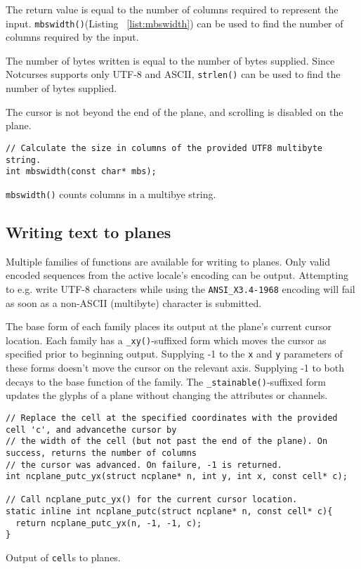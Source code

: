 \begin{denseitemize}
\item{The return value is equal to the number of columns required to represent the input.
    \texttt{mbswidth()}(Listing ~\ref{list:mbswidth}) can be used to find the number of columns required by
    the input.}
\item{The number of bytes written is equal to the number of bytes supplied. Since Notcurses
   supports only UTF-8 and ASCII, \texttt{strlen()} can be used to find the number of
   bytes supplied.}
\item{The cursor is not beyond the end of the plane, and scrolling is disabled
 on the plane.}
\end{denseitemize}

\begin{listing}[!htb]
\begin{verbatim}
// Calculate the size in columns of the provided UTF8 multibyte string.
int mbswidth(const char* mbs);
\end{verbatim}
\caption{\texttt{mbswidth()} counts columns in a multibye string.}
\label{list:mbswidth}
\end{listing}

\subsection{Writing text to planes}
\label{sec:outputtext}

Multiple families of functions are available for writing to planes. Only valid
encoded sequences from the active locale's encoding can be output. Attempting
to e.g. write UTF-8 characters while using the \texttt{ANSI\_X3.4-1968} encoding
will fail as soon as a non-ASCII (multibyte) character is submitted.

The base form of each family places its output at the plane's current cursor
location. Each family has a \texttt{\_xy()}-suffixed form which moves the
cursor as specified prior to beginning output. Supplying -1 to the \texttt{x}
and \texttt{y} parameters of these forms doesn't move the cursor on the
relevant axis. Supplying -1 to both decays to the base function of the family.
The \texttt{\_stainable()}-suffixed form updates the glyphs of a plane without
changing the attributes or channels.

\begin{listing}[!htb]
\begin{verbatim}
// Replace the cell at the specified coordinates with the provided cell 'c', and advancethe cursor by
// the width of the cell (but not past the end of the plane). On success, returns the number of columns
// the cursor was advanced. On failure, -1 is returned.
int ncplane_putc_yx(struct ncplane* n, int y, int x, const cell* c);

// Call ncplane_putc_yx() for the current cursor location.
static inline int ncplane_putc(struct ncplane* n, const cell* c){
  return ncplane_putc_yx(n, -1, -1, c);
}
\end{verbatim}
\caption{Output of \texttt{cell}s to planes.}
\label{list:putcell}
\end{listing}

